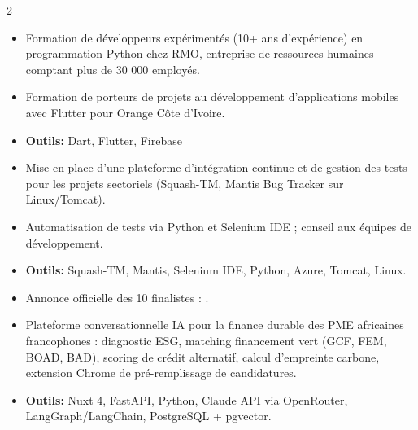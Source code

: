 \documentclass[10pt,a4paper,ragged2e,withhyper]{altacv}
\begin{document}
\begin{paracol}{2}
            \begin{itemize}
                \item Formation de développeurs expérimentés (10+ ans d'expérience) en programmation Python chez RMO, entreprise de ressources humaines comptant plus de 30 000 employés.
            \end{itemize}
            \divider

            \begin{itemize}
                \item Formation de porteurs de projets au développement d'applications mobiles avec Flutter pour Orange Côte d'Ivoire.
                \item \textcolor{SecondaryColor}{\textbf{Outils: }} Dart, Flutter, Firebase
            \end{itemize}

        \divider

        \begin{itemize}
            \item Mise en place d'une plateforme d'intégration continue et de gestion des tests pour les projets sectoriels (Squash-TM, Mantis Bug Tracker sur Linux/Tomcat).
            \item Automatisation de tests via Python et Selenium IDE ; conseil aux équipes de développement.
            \item \textcolor{SecondaryColor}{\textbf{Outils: }} Squash-TM, Mantis, Selenium IDE, Python, Azure, Tomcat, Linux.
        \end{itemize}

            \begin{itemize}
                \item Annonce officielle des 10 finalistes : .
                \item Plateforme conversationnelle IA pour la finance durable des PME africaines francophones : diagnostic ESG, matching financement vert (GCF, FEM, BOAD, BAD), scoring de crédit alternatif, calcul d'empreinte carbone, extension Chrome de pré-remplissage de candidatures.
                \item \textcolor{SecondaryColor}{\textbf{Outils: }} Nuxt 4, FastAPI, Python, Claude API via OpenRouter, LangGraph/LangChain, PostgreSQL + pgvector.
            \end{itemize}
            \divider


\end{paracol}
\end{document}
